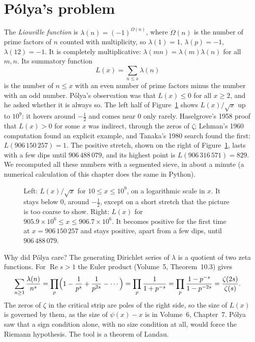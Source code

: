 \section{P\'olya's problem}

The \emph{Liouville function} is $\lambda(n)=(-1)^{\Omega(n)}$, where $\Omega(n)$ is the number of prime factors of $n$ counted with multiplicity, so
$\lambda(1)=1$, $\lambda(p)=-1$, $\lambda(12)=-1$. It is completely multiplicative: $\lambda(mn)=\lambda(m)\lambda(n)$ for all $m,n$. Its summatory function
\[
L(x)=\sum_{n\le x}\lambda(n)
\]
is the number of $n\le x$ with an even number of prime factors minus the number with an odd number. P\'olya's observation was that $L(x)\le0$ for all $x\ge2$, and
he asked whether it is always so. The left half of Figure~\ref{conjectures:fig:liouville} shows $L(x)/\sqrt x$ up to $10^9$: it hovers around $-\frac12$ and comes near $0$
only rarely. Haselgrove's 1958 proof that $L(x)>0$ for some $x$ was indirect, through the zeros of $\zeta$; Lehman's 1960 computation found an explicit example,
and Tanaka's 1980 search found the first: $L(906\,150\,257)=1$. The positive stretch, shown on the right of Figure~\ref{conjectures:fig:liouville}, lasts with a few dips
until $906\,488\,079$, and its highest point is $L(906\,316\,571)=829$. We recomputed all these numbers with a segmented sieve, in about a minute (a numerical calculation
of this chapter does the same in Python).

\begin{figure}[ht]
\centering
{}
\caption{Left: $L(x)/\sqrt x$ for $10\le x\le10^9$, on a logarithmic scale in $x$. It stays below $0$, around $-\frac12$, except on a short stretch that the
picture is too coarse to show. Right: $L(x)$ for $905.9\times10^6\le x\le906.7\times10^6$. It becomes positive for the first time at $x=906\,150\,257$ and
stays positive, apart from a few dips, until $906\,488\,079$.}
\label{conjectures:fig:liouville}
\end{figure}

Why did P\'olya care? The generating Dirichlet series of $\lambda$ is a quotient of two zeta functions. For $\operatorname{Re}s>1$ the Euler product
(Volume~5, Theorem~10.3) gives
\[
\sum_{n\ge1}\frac{\lambda(n)}{n^s}=\prod_p\Bigl(1-\frac1{p^s}+\frac1{p^{2s}}-\cdots\Bigr)=\prod_p\frac1{1+p^{-s}}=\prod_p\frac{1-p^{-s}}{1-p^{-2s}}=\frac{\zeta(2s)}{\zeta(s)}.
\]
The zeros of $\zeta$ in the critical strip are poles of the right side, so the size of $L(x)$ is governed by them, as the size of $\psi(x)-x$ is in Volume~6,
Chapter~7. P\'olya saw that a sign condition alone, with no size condition at all, would force the Riemann hypothesis. The tool is a theorem of Landau.

